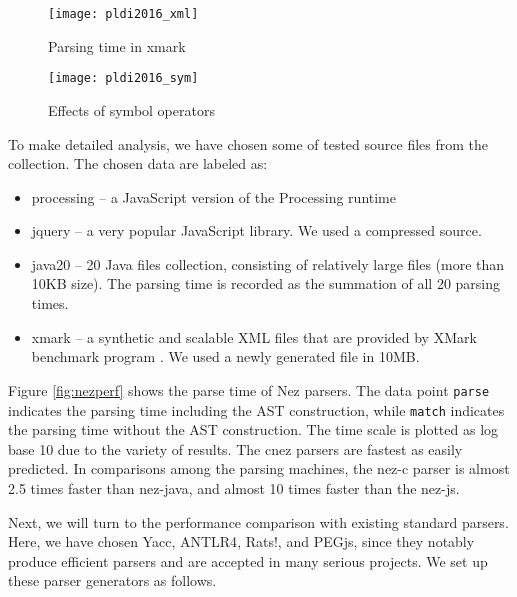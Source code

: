 \documentclass[preprint]{sigplanconf}
\begin{document}
\begin{figure}[tb]
\begin{center}
\texttt{[image: pldi2016\_xml]}
\caption{Parsing time in {\sf xmark}}
\label{fig:xmlperf}
\end{center}
\end{figure}

\begin{figure}[tb]
\begin{center}
\texttt{[image: pldi2016\_sym]}
\caption{Effects of symbol operators }
\label{fig:symperf}
\end{center}
\end{figure}

To make detailed analysis, we have chosen some of tested source files from the collection. The chosen data are labeled as:

\begin{itemize}
\item {\sf processing} -- a JavaScript version of the Processing runtime
\item {\sf jquery} -- a very popular JavaScript library. We used a compressed source.
\item {\sf java20} -- 20 Java files collection, consisting of relatively large files (more than 10KB size). The parsing time is recorded as the summation of all 20 parsing times. 
\item {\sf xmark} --  a synthetic and scalable XML files that are provided by XMark benchmark program \cite{VLDB02_XMark}. We used a newly generated file in 10MB. 
\end{itemize}

Figure \ref{fig:nezperf} shows the parse time of Nez parsers. The data point {\tt parse} indicates the parsing time including the AST construction, while {\tt match} indicates the parsing time without the AST construction. The time scale is plotted as log base 10 due to the variety of results. 
The {\sf cnez} parsers are fastest as easily predicted. In comparisons among the parsing machines, the {\sf nez-c} parser is almost 2.5 times faster than {\sf nez-java}, and almost 10 times faster than the {\sf nez-js}.  

Next, we will turn to the performance comparison with existing standard parsers. Here, we have chosen Yacc\cite{Yacc}, ANTLR4\cite{OOPSLA14_Antlr}, Rats$!$\cite{PLDI06_Rats}, and PEGjs\cite{PEGjs}, since they notably produce efficient parsers and are accepted in many serious projects. We set up these parser generators as follows.
\end{document}
